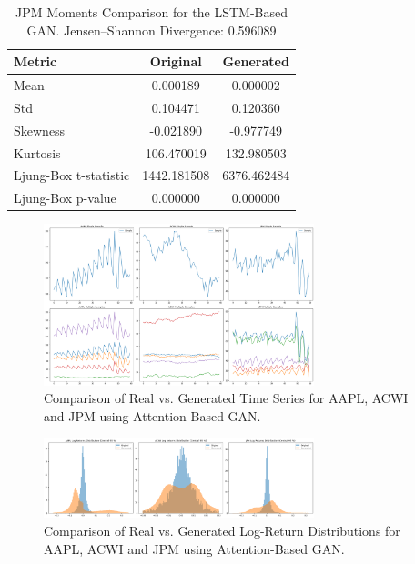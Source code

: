 \documentclass{article}
\begin{document}
\begin{table}[h!]
\centering
\begin{tabular}{lcc}
\hline
\textbf{Metric} & \textbf{Original} & \textbf{Generated} \\
\hline
Mean     & 0.000189 & 0.000002 \\
Std      & 0.104471 & 0.120360 \\
Skewness & -0.021890 & -0.977749 \\
Kurtosis & 106.470019 & 132.980503 \\
Ljung-Box t-statistic & 1442.181508 & 6376.462484 \\
Ljung-Box p-value & 0.000000 & 0.000000 \\
\hline
\end{tabular}
\caption{JPM Moments Comparison for the LSTM-Based GAN.
Jensen--Shannon Divergence: 0.596089}
\label{tab:jpm_lstm}
\end{table}

\begin{figure}[h!]
    \centering
    \includegraphics[width=0.7\textwidth]{attention_gen_samples}
    \caption{Comparison of Real vs. Generated Time Series for AAPL, ACWI and JPM using Attention-Based GAN.}
    \label{fig:attention_comparison}
\end{figure}

\begin{figure}[h!]
    \centering
    \includegraphics[width=0.7\textwidth]{attention_distributions}
    \caption{Comparison of Real vs. Generated Log-Return Distributions for AAPL, ACWI and JPM using Attention-Based GAN.}
    \label{fig:attention_comparison}
\end{figure}
\end{document}
